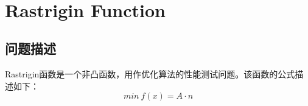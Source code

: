 \documentclass{article}
\title{
\vspace{2in}
\huge{\textbf{\hmwkClass \  \hmwkTitle}}\\
\Large\vspace{0.1in}\large{\hmwkSupplement}\\
\vspace{2.5in}
}
\author{\textbf{\hmwkAuthorName}}
\date{\hmwkClassTime}
\begin{document}
\maketitle
\thispagestyle{empty}

\newpage
\tableofcontents
\newpage

\section{Rastrigin Function}
\subsection{问题描述}
Rastrigin函数是一个非凸函数，用作优化算法的性能测试问题。该函数的公式描述如下：
\[ min \ f(x) = A \cdot n \]
\par 


\clearpage
\end{document}
